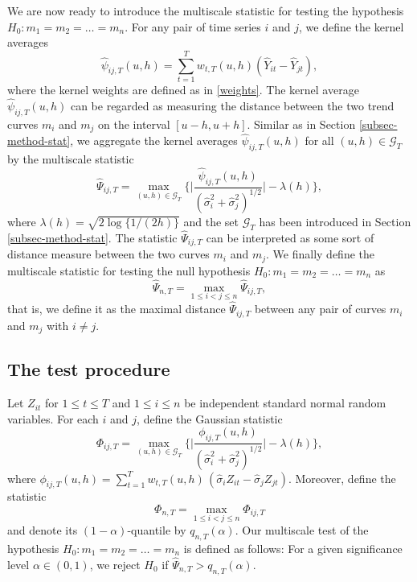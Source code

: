 \newpage
We are now ready to introduce the multiscale statistic for testing the hypothesis $H_0: m_1 = m_2 = \ldots = m_n$. For any pair of time series $i$ and $j$, we define the kernel averages
\[ \widehat{\psi}_{ij,T}(u,h) = \sum\limits_{t=1}^T w_{t,T}(u,h)(\widehat{Y}_{it} - \widehat{Y}_{jt}), \]
where the kernel weights are defined as in \eqref{weights}. The kernel average $\widehat{\psi}_{ij,T}(u,h)$ can be regarded as measuring the distance between the two trend curves $m_i$ and $m_j$ on the interval $[u-h,u+h]$. Similar as in Section \ref{subsec-method-stat}, we aggregate the kernel averages $\widehat{\psi}_{ij,T}(u,h)$ for all $(u,h) \in \mathcal{G}_T$ by the multiscale statistic 
\[ \widehat{\Psi}_{ij,T} = \max_{(u,h) \in \mathcal{G}_T} \Big\{ \Big|\frac{\widehat{\psi}_{ij,T}(u,h)}{(\widehat{\sigma}_i^2 + \widehat{\sigma}_j^2)^{1/2}}\Big| - \lambda(h) \Big\}, \] 
where $\lambda(h) = \sqrt{2 \log \{ 1/(2h) \}}$ and the set $\mathcal{G}_T$ has been introduced in Section \ref{subsec-method-stat}. The statistic $\widehat{\Psi}_{ij,T}$ can be interpreted as some sort of distance measure between the two curves $m_i$ and $m_j$. We finally define the multiscale statistic for testing the null hypothesis $H_0: m_1 =m_2 = \ldots = m_n$ as
\[ \widehat{\Psi}_{n,T} = \max_{1 \le i < j \le n} \widehat{\Psi}_{ij,T}, \]
that is, we define it as the maximal distance $\widehat{\Psi}_{ij,T}$ between any pair of curves $m_i$ and $m_j$ with $i \ne j$. 


\subsection{The test procedure}\label{subsec-test-equality-test}


Let $Z_{it}$ for $1 \le t \le T$ and $1 \le i \le n$ be independent standard normal random variables. For each $i$ and $j$, define the Gaussian statistic 
\[ \Phi_{ij,T} = \max_{(u,h) \in \mathcal{G}_T} \Big\{ \Big|\frac{\phi_{ij,T}(u,h)}{(\widehat{\sigma}_i^2 + \widehat{\sigma}_j^2)^{1/2}}\Big| - \lambda(h) \Big\}, \] 
where $\phi_{ij,T}(u,h) = \sum\nolimits_{t=1}^T w_{t,T}(u,h) \, (\widehat{\sigma}_i Z_{it} - \widehat{\sigma}_j Z_{jt})$. Moreover, define the statistic
\[ \Phi_{n,T} = \max_{1 \le i < j \le n} \Phi_{ij,T} \]
and denote its $(1-\alpha)$-quantile by $q_{n,T}(\alpha)$. Our multiscale test of the hypothesis $H_0: m_1 = m_2 = \ldots = m_n$ is defined as follows: For a given significance level $\alpha \in (0,1)$, we reject $H_0$ if $\widehat{\Psi}_{n,T} > q_{n,T}(\alpha)$. 


